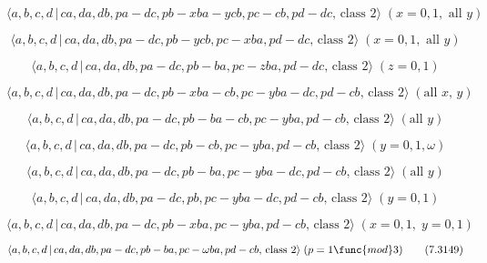 \documentclass[10pt]{article}
\begin{document}
\begin{equation}
\langle a,b,c,d\,|\,ca,da,db,pa-dc,pb-xba-ycb,pc-cb,pd-dc,\,\text{class }%
2\rangle \;(x=0,1,\text{ all }y)  \tag{7.3140}
\end{equation}

\begin{equation}
\langle a,b,c,d\,|\,ca,da,db,pa-dc,pb-ycb,pc-xba,pd-dc,\,\text{class }%
2\rangle \;(x=0,1,\text{ all }y)  \tag{7.3141}
\end{equation}

\begin{equation}
\langle a,b,c,d\,|\,ca,da,db,pa-dc,pb-ba,pc-zba,pd-dc,\,\text{class }%
2\rangle \;(z=0,1)  \tag{7.3142}
\end{equation}

\begin{equation}
\langle a,b,c,d\,|\,ca,da,db,pa-dc,pb-xba-cb,pc-yba-dc,pd-cb,\,\text{class }%
2\rangle \;(\text{all }x,\,y)  \tag{7.3143}
\end{equation}

\begin{equation}
\langle a,b,c,d\,|\,ca,da,db,pa-dc,pb-ba-cb,pc-yba,pd-cb,\,\text{class }%
2\rangle \;(\text{all }y)  \tag{7.3144}
\end{equation}

\begin{equation}
\langle a,b,c,d\,|\,ca,da,db,pa-dc,pb-cb,pc-yba,pd-cb,\,\text{class }%
2\rangle \;(y=0,1,\omega )  \tag{7.3145}
\end{equation}

\begin{equation}
\langle a,b,c,d\,|\,ca,da,db,pa-dc,pb-ba,pc-yba-dc,pd-cb,\,\text{class }%
2\rangle \;(\text{all }y)  \tag{7.3146}
\end{equation}

\begin{equation}
\langle a,b,c,d\,|\,ca,da,db,pa-dc,pb,pc-yba-dc,pd-cb,\,\text{class }%
2\rangle \;(y=0,1)  \tag{7.3147}
\end{equation}

\begin{equation}
\langle a,b,c,d\,|\,ca,da,db,pa-dc,pb-xba,pc-yba,pd-cb,\,\text{class }%
2\rangle \;(x=0,1,\;y=0,1)  \tag{7.3148}
\end{equation}

\begin{equation}
\langle a,b,c,d\,|\,ca,da,db,pa-dc,pb-ba,pc-\omega ba,pd-cb,\,\text{class }%
2\rangle \;(p=1\func{mod}3)  \tag{7.3149}
\end{equation}
\end{document}
